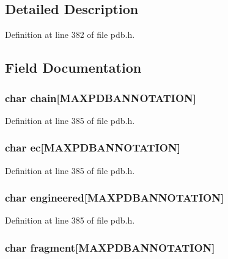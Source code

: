 \subsection{Detailed Description}


Definition at line 382 of file pdb.\-h.



\subsection{Field Documentation}
\hypertarget{struct__compnd_a9d34969ea8f7d3effdf008e57acc3450}{
\subsubsection[{chain}]{\setlength{\rightskip}{0pt plus 5cm}char chain\mbox{[}{\bf M\-A\-X\-P\-D\-B\-A\-N\-N\-O\-T\-A\-T\-I\-O\-N}\mbox{]}}}\label{struct__compnd_a9d34969ea8f7d3effdf008e57acc3450}


Definition at line 385 of file pdb.\-h.

\hypertarget{struct__compnd_aec604847eceb625b2ed92d4097de0ab5}{
\subsubsection[{ec}]{\setlength{\rightskip}{0pt plus 5cm}char ec\mbox{[}{\bf M\-A\-X\-P\-D\-B\-A\-N\-N\-O\-T\-A\-T\-I\-O\-N}\mbox{]}}}\label{struct__compnd_aec604847eceb625b2ed92d4097de0ab5}


Definition at line 385 of file pdb.\-h.

\hypertarget{struct__compnd_ad3279472c5db456acceb7be10ede7013}{
\subsubsection[{engineered}]{\setlength{\rightskip}{0pt plus 5cm}char engineered\mbox{[}{\bf M\-A\-X\-P\-D\-B\-A\-N\-N\-O\-T\-A\-T\-I\-O\-N}\mbox{]}}}\label{struct__compnd_ad3279472c5db456acceb7be10ede7013}


Definition at line 385 of file pdb.\-h.

\hypertarget{struct__compnd_ad4c629b977ff4356d22f7a98d349bad3}{
\subsubsection[{fragment}]{\setlength{\rightskip}{0pt plus 5cm}char fragment\mbox{[}{\bf M\-A\-X\-P\-D\-B\-A\-N\-N\-O\-T\-A\-T\-I\-O\-N}\mbox{]}}}\label{struct__compnd_ad4c629b977ff4356d22f7a98d349bad3}


